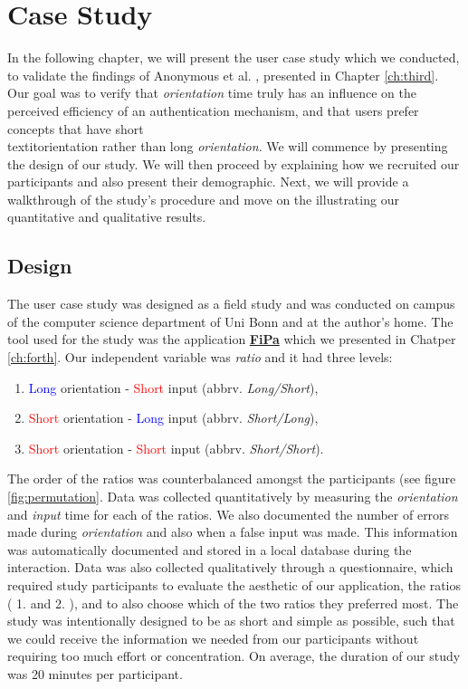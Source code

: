 
\chapter{Case Study}\label{ch:fifth}

In the following chapter, we will present the user case study which we conducted, to validate the findings of Anonymous et al. \cite{anonymous}, presented in Chapter \ref{ch:third}. Our goal was to verify that \textit{orientation} time truly has an influence on the perceived efficiency of an authentication mechanism, and that users prefer concepts that have short \\textit{orientation} rather than long \textit{orientation}. We will commence by presenting the design of our study. We will then proceed by explaining how we recruited our participants and also present their demographic. Next, we will provide a walkthrough of the study's procedure and move on the illustrating our quantitative and qualitative results.



\section{Design} \label{5.1}

The user case study was designed as a field study and was conducted on campus of the computer science department of Uni Bonn and at the author's home. The tool used for the study was the application \underline{\textbf{FiPa}} which we presented in Chatper \ref{ch:forth}. Our independent variable was \textit{ratio} and it had three levels:
\begin{enumerate}
    \item \textcolor{blue}{Long} orientation - \textcolor{red}{Short} input (abbrv. \textit{Long/Short}), 
    \item \textcolor{red}{Short} orientation - \textcolor{blue}{Long} input (abbrv. \textit{Short/Long}), 
    \item \textcolor{red}{Short} orientation - \textcolor{red}{Short} input (abbrv. \textit{Short/Short}). 
\end{enumerate}

The order of the ratios was counterbalanced amongst the participants (see figure \ref{fig:permutation}. Data was collected quantitatively by measuring the \textit{orientation} and \textit{input} time for each of the ratios. We also documented the number of errors made during \textit{orientation} and also when a false input was made. This information was automatically documented and stored in a local database during the interaction. Data was also collected qualitatively through a questionnaire, which required study participants to evaluate the aesthetic of our application, the ratios ( 1. and 2. ), and to also choose which of the two ratios they preferred most. The study was intentionally designed to be as short and simple as possible, such that we could receive the information we needed from our participants without requiring too much effort or concentration. On average, the duration of our study was 20 minutes per participant. 

